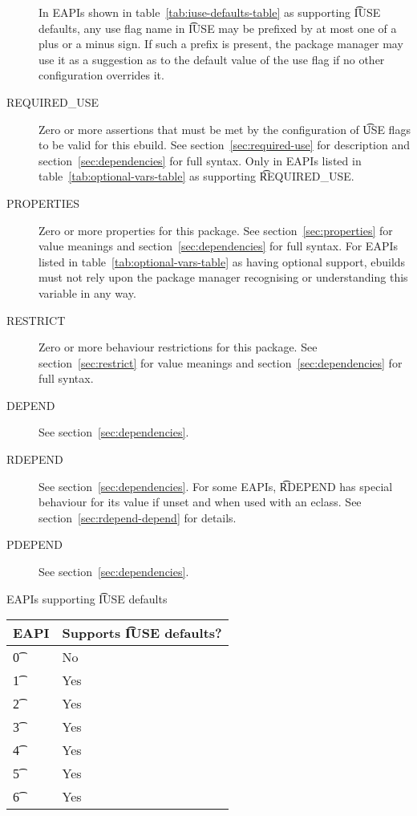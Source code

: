 \begin{description}
     In EAPIs shown in table~\ref{tab:iuse-defaults-table} as supporting
    \t{IUSE} defaults, any use flag name in \t{IUSE} may be prefixed by at most one of a plus or a
    minus sign. If such a prefix is present, the package manager may use it as a suggestion as to
    the default value of the use flag if no other configuration overrides it.
\item[REQUIRED\_USE]  Zero or more assertions that must be met by the
    configuration of \t{USE} flags to be valid for this ebuild. See section~\ref{sec:required-use}
    for description and section~\ref{sec:dependencies} for full syntax. Only in EAPIs listed in
    table~\ref{tab:optional-vars-table} as supporting \t{REQUIRED\_USE}.
\item[PROPERTIES]  Zero or more properties for this package.
    See section~\ref{sec:properties} for value meanings and section~\ref{sec:dependencies} for full
    syntax. For EAPIs listed in table~\ref{tab:optional-vars-table} as having optional support,
    ebuilds must not rely upon the package manager recognising or understanding this variable in
    any way.
\item[RESTRICT] Zero or more behaviour restrictions for this package. See section~\ref{sec:restrict}
    for value meanings and section~\ref{sec:dependencies} for full syntax.
\item[DEPEND] See section~\ref{sec:dependencies}.
\item[RDEPEND] See section~\ref{sec:dependencies}. For some EAPIs, \t{RDEPEND} has special behaviour
    for its value if unset and when used with an eclass. See section~\ref{sec:rdepend-depend} for
    details.
\item[PDEPEND] See section~\ref{sec:dependencies}.
\end{description}

\begin{centertable}{EAPIs supporting \t{IUSE} defaults} \label{tab:iuse-defaults-table}
    \begin{tabular}{ l l }
        \toprule
        \multicolumn{1}{c}{\textbf{EAPI}} &
        \multicolumn{1}{c}{\textbf{Supports \t{IUSE} defaults?}} \\
        \midrule
    \t{0} & No \\
    \t{1} & Yes \\
    \t{2} & Yes \\
    \t{3} & Yes \\
    \t{4} & Yes \\
    \t{5} & Yes \\
    \t{6} & Yes \\
    \bottomrule
    \end{tabular}
\end{centertable}

